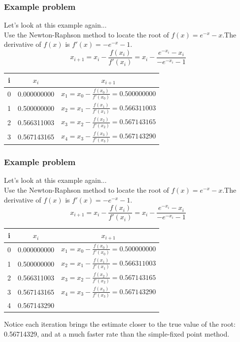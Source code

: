 \documentclass{if-beamer}
\begin{document}
\begin{frame}
\frametitle{Example problem}
Let's look at this example again...\\\vspace{3pt}
Use the Newton-Raphson method to locate the root of $f(x) = e^{-x}-x$.The derivative of $f(x)$ is $f'(x) = -e^{-x}-1$.
$$x_{i+1} = x_i - \frac{f(x_i)}{f'(x_i)} =  x_i - \frac{e^{-x_i}-x_i}{-e^{-x_i}-1}$$
\begin{table}
	\begin{tabular}{c | c | c}
		i & $x_i$ & $x_{i+1}$ \\
		\hline
		0 & 0.000000000 & $x_1= x_0 - \frac{f(x_0)}{f'(x_0)} = 0.500000000$\\ 
		1 & 0.500000000 & $x_2= x_1 - \frac{f(x_1)}{f'(x_1)} = 0.566311003$ \\
		2 & 0.566311003	 & $x_3= x_2 - \frac{f(x_2)}{f'(x_2)} = 0.567143165	$ \\ 
		3 & 0.567143165	 & $x_4= x_3 - \frac{f(x_3)}{f'(x_3)} = 0.567143290$	 \\
	\end{tabular}
\end{table}

\end{frame}


\begin{frame}
\frametitle{Example problem}
Let's look at this example again...\\\vspace{3pt}
Use the Newton-Raphson method to locate the root of $f(x) = e^{-x}-x$.The derivative of $f(x)$ is $f'(x) = -e^{-x}-1$.
$$x_{i+1} = x_i - \frac{f(x_i)}{f'(x_i)} =  x_i - \frac{e^{-x_i}-x_i}{-e^{-x_i}-1}$$
\begin{table}
	\begin{tabular}{c | c | c}
		i & $x_i$ & $x_{i+1}$ \\
		\hline
		0 & 0.000000000 & $x_1= x_0 - \frac{f(x_0)}{f'(x_0)} = 0.500000000$\\ 
		1 & 0.500000000 & $x_2= x_1 - \frac{f(x_1)}{f'(x_1)} = 0.566311003$ \\
		2 & 0.566311003	 & $x_3= x_2 - \frac{f(x_2)}{f'(x_2)} = 0.567143165	$ \\ 
		3 & 0.567143165	 & $x_4= x_3 - \frac{f(x_3)}{f'(x_3)} = 0.567143290$	 \\
		4 & 0.567143290 &
	\end{tabular}
\end{table}
Notice each iteration brings the estimate closer to the true value of the root: 0.56714329, and at a much faster rate than the simple-fixed point method.
\end{frame}
\end{document}
